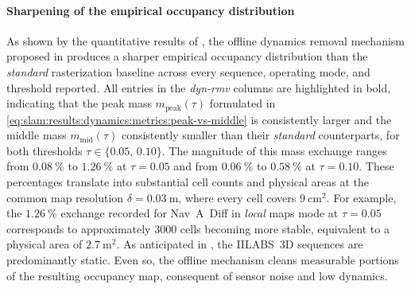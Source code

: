 \clearpage

\paragraph{Sharpening of the empirical occupancy distribution}
As shown by the quantitative results of
, the offline dynamics removal
mechanism proposed in  produces a
sharper empirical occupancy distribution than the \emph{standard}
rasterization baseline across every sequence, operating mode, and
threshold reported. All entries in the \emph{dyn-rmv} columns are
highlighted in bold, indicating that the peak mass
$m_{\mathrm{peak}}(\tau)$ formulated in
\eqref{eq:slam:results:dynamics:metrics:peak-vs-middle} is
consistently larger and the middle mass $m_{\mathrm{mid}}(\tau)$
consistently smaller than their \emph{standard} counterparts, for
both thresholds $\tau \in \{0.05,\,0.10\}$.
The magnitude of this mass exchange ranges from $\SI{0.08}{\percent}$
to $\SI{1.26}{\percent}$ at $\tau = 0.05$ and from
$\SI{0.06}{\percent}$ to $\SI{0.58}{\percent}$ at $\tau = 0.10$.
These percentages translate into substantial cell counts and physical
areas at the common map resolution $\delta = \SI{0.03}{\metre}$, where
every cell covers $\SI{9}{\centi\metre\squared}$. For example, the
$\SI{1.26}{\percent}$ exchange recorded for Nav~A~Diff in \emph{local}
maps mode at $\tau = 0.05$ corresponds to approximately $\num{3000}$
cells becoming more stable, equivalent to a physical area of
$\SI{2.7}{\metre\squared}$. As anticipated in
, the IILABS~3D sequences are
predominantly static. Even so, the offline mechanism cleans measurable portions
of the resulting occupancy map, consequent of sensor noise and low dynamics.

